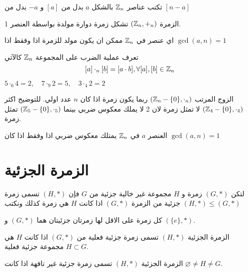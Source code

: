\begin{note}
	تكتب عناصر $\mathbb{Z}_n$ بالشكل $a$ بدل من $[a]$ و $-a$ بدل من $[n-a]$
\end{note}

\begin{theorem}
	الزمرة $(\mathbb{Z}_n, +_n)$ تشكل زمرة دوارة مولدة بواسطة العنصر 1.
\end{theorem}

\begin{note}
	اي عنصر في $\mathbb{Z}_n$ ممكن ان يكون مولد للزمرة اذا وفقط اذا $\gcd(a,n)=1$
\end{note}
\begin{note}
 تعرف عملية الضرب على المجموعة $\mathbb{Z}_n$ كالآتي 
\[
[a] \cdot_n [b] = [a\cdot b] , \forall [a],[b] \in \mathbb{Z}_n
\]
\end{note}

\begin{example}
	$5\cdot_6 4 =2,\quad 7\cdot_9 2=5,\quad 3\cdot_4 2=2$
\end{example}

\begin{note}
	الزوج المرتب $(\mathbb{Z}_n - \{0\}, \cdot_n)$ ربما يكون زمرة اذا كان $n$ عدد اولي. للتوضيح اكثر $(\mathbb{Z}_4-\{0\}, \cdot_4)$ لا تمثل زمرة لان 2 لا يملك معكوس ضربي بينما $(\mathbb{Z}_5-\{0\},\cdot_5)$ تمثل زمرة.
\end{note}

\begin{note}
	العنصر $a$ في $\mathbb{Z}_n$ يمتلك معكوس ضربي اذا وفقط اذا كان $\gcd(a,n)=1$
\end{note}

\section{الزمرة الجزئية}

\begin{definition}
	لتكن $(G, *)$ زمرة و $H$ مجموعة غير خالية جزئية من $G$ فإن $(H, *)$ تسمى زمرة جزئية من الزمرة $(G, *)$ اذا كانت $H$ هي زمرة كذلك ونكتب $(H, *)\leq (G, *)$
\end{definition}
\begin{example}
	كل زمرة على الاقل لها زمرتان جزئيتان هما $(G, *) $ و $(\{e\}, *)$.
\end{example}

\begin{definition}
	الزمرة الجزئية $(H, *)$ تسمى زمرة جزئية فعلية من $(G, *)$ اذا كانت $H$ هي مجموعة جزئية فعلية $H \subset G$.
\end{definition}

\begin{definition}
		الزمرة الجزئية $(H, *)$ تسمى زمرة جزئية غير تافهة اذا كانت $\varnothing\neq H\neq G$.  
\end{definition}

